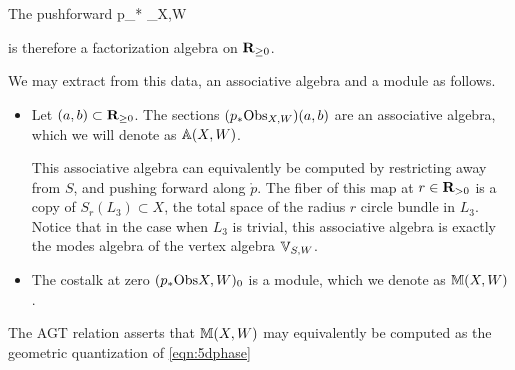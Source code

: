 \documentclass[11pt]{amsart}
\begin{document}
The pushforward
\beqn
p_* \Obs_{X,W}
\eeqn

is therefore a factorization algebra on $\R_{\geq 0}$. 

We may extract from this data, an associative algebra and a module as follows. 

\begin{itemize}
\item Let $(a,b)\subset \R_{\geq 0}$. The sections $(p_* \Obs_{X, W})(a,b)$ are an associative algebra, which we will denote as $\AA(X, W)$. 

This associative algebra can equivalently be computed by restricting away from $S$, and pushing forward along $\mathring p$. The fiber of this map at $r \in \R_{>0}$ is a copy of $S_r(L_3)\subset X$, the total space of the radius $r$ circle bundle in $L_3$. Notice that in the case when $L_3$ is trivial, this associative algebra is exactly the modes algebra of the vertex algebra $\VV_{S,W}$. 

\item The costalk at zero $(p_*\Obs{X,W})_0$ is a module, which we denote as $\MM (X, W)$. 
\end{itemize}

The AGT relation asserts that $\MM(X,W)$ may equivalently be computed as the geometric quantization of \eqref{eqn:5dphase}
\end{document}
